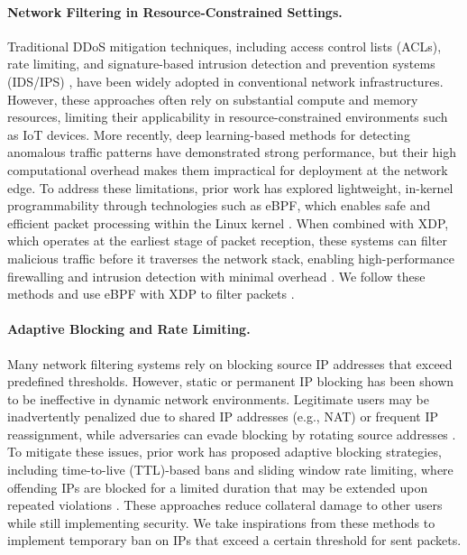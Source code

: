\documentclass[twocolumn, 10pt]{scrartcl}
\begin{document}
\paragraph{Network Filtering in Resource-Constrained Settings.}
 Traditional DDoS mitigation techniques, including access control lists (ACLs), rate limiting, and signature-based intrusion detection and prevention systems (IDS/IPS) \cite{roesch1999snort, bouziani2019comparative}, have been widely adopted in conventional network infrastructures. However, these approaches often rely on substantial compute and memory resources, limiting their applicability in resource-constrained environments such as IoT devices. More recently, deep learning-based methods for detecting anomalous traffic patterns \cite{niyaz2016deep, abdulrahman2025deep} have demonstrated strong performance, but their high computational overhead makes them impractical for deployment at the network edge. To address these limitations, prior work has explored lightweight, in-kernel programmability through technologies such as eBPF, which enables safe and efficient packet processing within the Linux kernel \cite{vieira2020fast}. When combined with XDP, which operates at the earliest stage of packet reception, these systems can filter malicious traffic before it traverses the network stack, enabling high-performance firewalling and intrusion detection with minimal overhead \cite{hadi2024ikern}. We follow these methods and use eBPF with XDP to filter packets \citep{tolay2025ebpf}.
\paragraph{Adaptive Blocking and Rate Limiting.}
 Many network filtering systems rely on blocking source IP addresses that exceed predefined thresholds. However, static or permanent IP blocking has been shown to be ineffective in dynamic network environments. Legitimate users may be inadvertently penalized due to shared IP addresses (e.g., NAT) or frequent IP reassignment, while adversaries can evade blocking by rotating source addresses \citep{ramanathan2020quantifying, ford2011issues}. To mitigate these issues, prior work has proposed adaptive blocking strategies, including time-to-live (TTL)-based bans and sliding window rate limiting, where offending IPs are blocked for a limited duration that may be extended upon repeated violations \citep{ellingwood2014fail2ban}. These approaches reduce collateral damage to other users while still implementing security. We take inspirations from these methods to implement temporary ban on IPs that exceed a certain threshold for sent packets.
\end{document}
